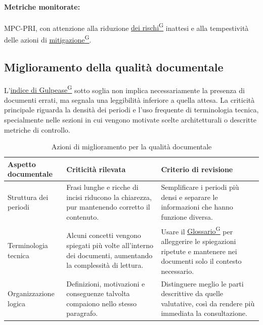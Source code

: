 \documentclass[a4paper,12pt]{article}
\providecommand{\glslink}[2]{\href{https://alittlebyte-19.github.io/Documentazione/glossario.html\#gls-#1}{\underline{#2}\textsuperscript{\scriptsize G}}}
\begin{document}
\paragraph*{Metriche monitorate:} MPC-PRI, con attenzione alla riduzione \glslink{mitigazione-dei-rischi}{dei rischi} inattesi e alla tempestività delle azioni di \glslink{mitigazione-dei-rischi}{mitigazione}.

\subsection{Miglioramento della qualità documentale}

L'\glslink{indice-di-gulpease-mpc-ig}{indice di Gulpease} sotto soglia non implica necessariamente la presenza di documenti errati, ma segnala una leggibilità inferiore a quella attesa. La criticità principale riguarda la densità dei periodi e l'uso frequente di terminologia tecnica, specialmente nelle sezioni in cui vengono motivate scelte architetturali o descritte metriche di controllo.

\begin{table}[H]
    \centering
    \renewcommand{\arraystretch}{1.25}
    \begin{tabularx}{\textwidth}{|p{3.2cm}|X|X|}
        \hline
        \rowcolor{gray!35}
        \textbf{Aspetto documentale} & \textbf{Criticità rilevata} & \textbf{Criterio di revisione} \\
        \hline
        Struttura dei periodi & Frasi lunghe e ricche di incisi riducono la chiarezza, pur mantenendo corretto il contenuto. & Semplificare i periodi più densi e separare le informazioni che hanno funzione diversa. \\
        \hline
        Terminologia tecnica & Alcuni concetti vengono spiegati più volte all'interno dei documenti, aumentando la complessità di lettura. & Usare il \glslink{glossario}{Glossario} per alleggerire le spiegazioni ripetute e mantenere nei documenti solo il contesto necessario. \\
        \hline
        Organizzazione logica & Definizioni, motivazioni e conseguenze talvolta compaiono nello stesso paragrafo. & Distinguere meglio le parti descrittive da quelle valutative, così da rendere più immediata la consultazione. \\
        \hline
    \end{tabularx}
    \caption{Azioni di miglioramento per la qualità documentale}
\end{table}
\end{document}
